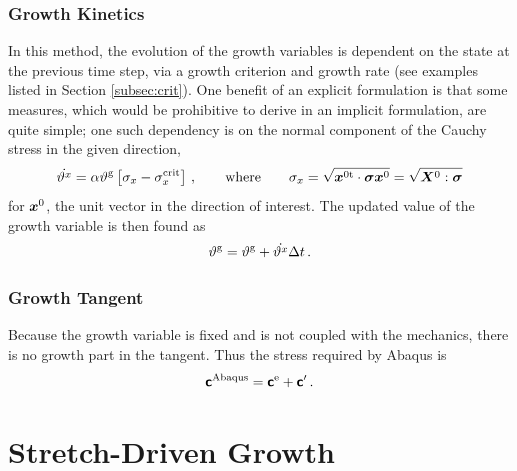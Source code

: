 \documentclass[10pt,letterpaper,oneside]{report}
\newcommand{\ten}[1]{\mbox{\boldmath $#1$}{}}
\newcommand{\tenf}[1]{\mbox{{\sffamily{\bfseries {#1}}}}}
\newcommand{\scas}[1]{\mbox{{\scriptsize{${\rm{#1}}$}}}{}}
\begin{document}
\begin{itemize}
\subsubsection{Growth Kinetics}
In this method, the evolution of the growth variables is dependent on the state at the previous time step, via a growth criterion and growth rate (see examples listed in Section \ref{subsec:crit}).  One benefit of an explicit formulation is that some measures, which would be prohibitive to derive in an implicit formulation, are quite simple; one such dependency is on the normal component of the Cauchy stress in the given direction, 
\begin{equation}
\dot{\vartheta^x} = \alpha \vartheta^{\scas{g}} \left[ \sigma_x - \sigma_x^{\scas{crit}} \right] \, , 
\qquad \mbox{where} \qquad 
\sigma_x = \sqrt{ \ten{x}^{0 \scas{t}} \cdot \ten{\sigma} \ten{x}^0 } = \sqrt{ \ten{X}^{0} : \ten{\sigma} } 
\end{equation} 
for $\ten{x}^0$, the unit vector in the direction of interest.  The updated value of the growth variable is then found as 
\begin{equation}
\vartheta^{\scas{g}} = \vartheta^{\scas{g}} + \dot{\vartheta^x} \Delta t \, . 
\end{equation}

\subsubsection{Growth Tangent}
Because the growth variable is fixed and is not coupled with the mechanics, there is no growth part in the tangent.  Thus the stress required by Abaqus is 
\begin{equation}
\tenf{c}^{\scas{Abaqus}} = \tenf{c}^{\scas{e}} + \tenf{c}' \, . 
\end{equation}


\section{Stretch-Driven Growth}


\end{itemize}
\end{document}
